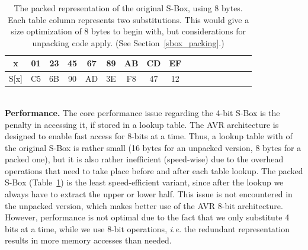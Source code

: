 \documentclass[11pt]{llncs2e} %
\begin{document}
\begin{table}[h]
\centering
\footnotesize
\begin{tabular}{| c | c  | c | c | c  | c | c | c  | c | c | c  | c | c | c  | c | c | c |}
\hline
  x & 01 & 23 & 45 & 67 & 89 & AB & CD & EF   \\
\hline
  S[x] & C5 & 6B & 90 & AD & 3E & F8 & 47 & 12   \\
\hline
\end{tabular}
 \caption{\footnotesize The packed representation of the original S-Box, using 8 bytes. Each table column represents two substitutions. This would give a size optimization of 8 bytes to begin with, but considerations for unpacking code apply. (See Section~\ref{sbox_packing}.)}
 \label{packed_sbox}
\end{table}\\
\textbf{Performance.} The core performance issue regarding the 4-bit S-Box is the penalty in accessing it, if stored in a lookup table. The AVR architecture is designed to enable fast access for 8-bits at a time. Thus, a lookup table with of the original S-Box is rather small (16 bytes for an unpacked version, 8 bytes for a packed one), but it is also rather inefficient (speed-wise) due to the overhead operations that need to take place before and after each table lookup. The packed S-Box (Table~\ref{packed_sbox}) is the least speed-efficient variant, since after the lookup we always have to extract the upper or lower half. This issue is not encountered in the unpacked version, which makes better use of the AVR 8-bit architecture. However, performance is not optimal  due to the fact that we only substitute 4 bits at a time, while we use 8-bit operations, \emph{i.e.} the redundant representation results in more memory accesses than needed. 
\end{document}
